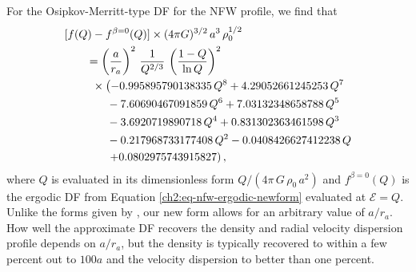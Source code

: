 For the Osipkov-Merritt-type DF for the NFW profile, we find that 
\begin{equation}
\begin{split}
    \huge[f(Q)&-f^{\beta=0}(Q)\huge]\times(4\pi G)^{3/2}\,a^3\,\rho_0^{1/2} \\&\!\!\!=  \left({a \over r_a}\right)^2\, {1 \over Q^{2/3}}\,\left({1-Q \over \ln Q}\right)^2\,\\
    & \times \left(- 0.995895790138335 \,Q^{8} + 4.29052661245253 \,Q^{7}\right.\\&\quad\
    - 7.60690467091859\, Q^{6} + 7.03132348658788\, Q^{5}\\&\quad\ - 3.6920719890718\, Q^{4} + 0.831302363461598\, Q^{3}\\&\quad\ - 0.217968733177408\, Q^{2} - 0.0408426627412238\, Q\\&\quad\ \left.+ 0.0802975743915827\right),
\end{split}
\end{equation}
where $Q$ is evaluated in its dimensionless form $Q/(4\pi\,G\,\rho_0\,a^2)$ and $f^{\beta=0}(Q)$ is the ergodic DF from Equation \eqref{ch2:eq-nfw-ergodic-newform} evaluated at $\mathcal{E} = Q$. Unlike the forms given by \textcite{widrow00}, our new form allows for an arbitrary value of $a/r_a$. How well the approximate DF recovers the density and radial velocity dispersion profile depends on $a/r_a$, but the density is typically recovered to within a few percent out to $100a$ and the velocity dispersion to better than one percent.
